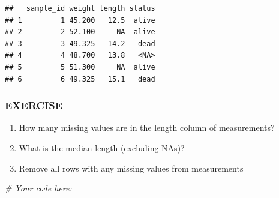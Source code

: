 \documentclass[
]{article}
\newenvironment{Shaded}{\begin{snugshade}}{\end{snugshade}}
\newcommand{\AttributeTok}[1]{\textcolor[rgb]{0.13,0.29,0.53}{#1}}
\newcommand{\CommentTok}[1]{\textcolor[rgb]{0.56,0.35,0.01}{\textit{#1}}}
\newcommand{\ConstantTok}[1]{\textcolor[rgb]{0.56,0.35,0.01}{#1}}
\newcommand{\DecValTok}[1]{\textcolor[rgb]{0.00,0.00,0.81}{#1}}
\newcommand{\FloatTok}[1]{\textcolor[rgb]{0.00,0.00,0.81}{#1}}
\newcommand{\FunctionTok}[1]{\textcolor[rgb]{0.13,0.29,0.53}{\textbf{#1}}}
\newcommand{\NormalTok}[1]{#1}
\newcommand{\OtherTok}[1]{\textcolor[rgb]{0.56,0.35,0.01}{#1}}
\newcommand{\SpecialCharTok}[1]{\textcolor[rgb]{0.81,0.36,0.00}{\textbf{#1}}}
\providecommand{\tightlist}{%
  \setlength{\itemsep}{0pt}\setlength{\parskip}{0pt}}
\begin{document}
\begin{Shaded}
\end{Shaded}

\begin{verbatim}
##   sample_id weight length status
## 1         1 45.200   12.5  alive
## 2         2 52.100     NA  alive
## 3         3 49.325   14.2   dead
## 4         4 48.700   13.8   <NA>
## 5         5 51.300     NA  alive
## 6         6 49.325   15.1   dead
\end{verbatim}

\subsubsection{EXERCISE}\label{exercise-5}

\begin{enumerate}
\def\labelenumi{\arabic{enumi}.}
\tightlist
\item
  How many missing values are in the length column of measurements?
\item
  What is the median length (excluding NAs)?
\item
  Remove all rows with any missing values from measurements
\end{enumerate}

\begin{Shaded}
\begin{Highlighting}[]
\CommentTok{\# Your code here:}
\end{Highlighting}
\end{Shaded}
\end{document}
